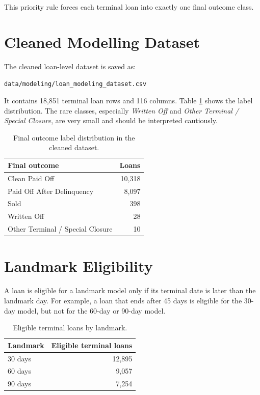 \documentclass[11pt]{article}
\begin{document}
This priority rule forces each terminal loan into exactly one final outcome class.

\section{Cleaned Modelling Dataset}

The cleaned loan-level dataset is saved as:

\begin{center}
\texttt{data/modeling/loan\_modeling\_dataset.csv}
\end{center}

It contains 18,851 terminal loan rows and 116 columns. Table \ref{tab:label-distribution} shows the label distribution. The rare classes, especially \textit{Written Off} and \textit{Other Terminal / Special Closure}, are very small and should be interpreted cautiously.

\begin{table}[h]
\centering
\caption{Final outcome label distribution in the cleaned dataset.}
\label{tab:label-distribution}
\begin{tabular}{lr}
\toprule
Final outcome & Loans \\
\midrule
Clean Paid Off & 10,318 \\
Paid Off After Delinquency & 8,097 \\
Sold & 398 \\
Written Off & 28 \\
Other Terminal / Special Closure & 10 \\
\bottomrule
\end{tabular}
\end{table}

\section{Landmark Eligibility}

A loan is eligible for a landmark model only if its terminal date is later than the landmark day. For example, a loan that ends after 45 days is eligible for the 30-day model, but not for the 60-day or 90-day model.

\begin{table}[h]
\centering
\caption{Eligible terminal loans by landmark.}
\label{tab:eligibility}
\begin{tabular}{lr}
\toprule
Landmark & Eligible terminal loans \\
\midrule
30 days & 12,895 \\
60 days & 9,057 \\
90 days & 7,254 \\
\bottomrule
\end{tabular}
\end{table}
\end{document}
